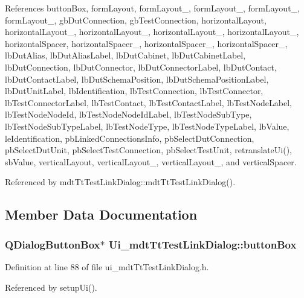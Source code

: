 References button\-Box, form\-Layout, form\-Layout\-\_, form\-Layout\-\_, form\-Layout\-\_, form\-Layout\-\_, gb\-Dut\-Connection, gb\-Test\-Connection, horizontal\-Layout, horizontal\-Layout\-\_, horizontal\-Layout\-\_, horizontal\-Layout\-\_, horizontal\-Layout\-\_, horizontal\-Spacer, horizontal\-Spacer\-\_, horizontal\-Spacer\-\_, horizontal\-Spacer\-\_, lb\-Dut\-Alias, lb\-Dut\-Alias\-Label, lb\-Dut\-Cabinet, lb\-Dut\-Cabinet\-Label, lb\-Dut\-Connection, lb\-Dut\-Connector, lb\-Dut\-Connector\-Label, lb\-Dut\-Contact, lb\-Dut\-Contact\-Label, lb\-Dut\-Schema\-Position, lb\-Dut\-Schema\-Position\-Label, lb\-Dut\-Unit\-Label, lb\-Identification, lb\-Test\-Connection, lb\-Test\-Connector, lb\-Test\-Connector\-Label, lb\-Test\-Contact, lb\-Test\-Contact\-Label, lb\-Test\-Node\-Label, lb\-Test\-Node\-Node\-Id, lb\-Test\-Node\-Node\-Id\-Label, lb\-Test\-Node\-Sub\-Type, lb\-Test\-Node\-Sub\-Type\-Label, lb\-Test\-Node\-Type, lb\-Test\-Node\-Type\-Label, lb\-Value, le\-Identification, pb\-Linked\-Connections\-Info, pb\-Select\-Dut\-Connection, pb\-Select\-Dut\-Unit, pb\-Select\-Test\-Connection, pb\-Select\-Test\-Unit, retranslate\-Ui(), sb\-Value, vertical\-Layout, vertical\-Layout\-\_, vertical\-Layout\-\_, and vertical\-Spacer.



Referenced by mdt\-Tt\-Test\-Link\-Dialog\-::mdt\-Tt\-Test\-Link\-Dialog().



\subsection{Member Data Documentation}
\hypertarget{class_ui__mdt_tt_test_link_dialog_a510b88fd1c0c96896476b8f1b3526ca7}{
\subsubsection[{button\-Box}]{\setlength{\rightskip}{0pt plus 5cm}Q\-Dialog\-Button\-Box$\ast$ Ui\-\_\-mdt\-Tt\-Test\-Link\-Dialog\-::button\-Box}}\label{class_ui__mdt_tt_test_link_dialog_a510b88fd1c0c96896476b8f1b3526ca7}


Definition at line 88 of file ui\-\_\-mdt\-Tt\-Test\-Link\-Dialog.\-h.



Referenced by setup\-Ui().

